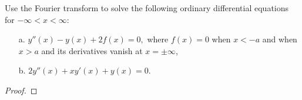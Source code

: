 \begin{problem}{2.8}
  Use the Fourier transform to solve the following ordinary differential equations
  for $-\infty < x < \infty$:
  \begin{enumerate}
    \item [a.] $y''(x) - y(x) + 2f(x) = 0,$ where $f(x) = 0$ when $x < -a$
      and when $x > a$ and its derivatives vanish at $x = \pm \infty$,
    \item [b.] $2 y''(x) + x y'(x) + y(x) = 0.$
  \end{enumerate}
\end{problem}

\begin{proof}
\end{proof}
\newpage
